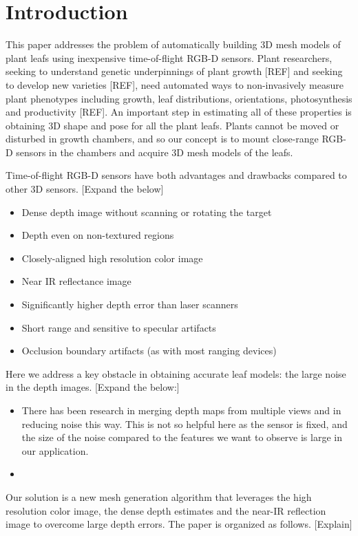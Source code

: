 \section{Introduction}
\label{sec:intro}

This paper addresses the problem of automatically building $3$D mesh models of plant leafs using inexpensive time-of-flight RGB-D sensors.  Plant researchers, seeking to understand genetic underpinnings of plant growth [REF] and seeking to develop new varieties [REF], need automated ways to non-invasively measure plant phenotypes including growth, leaf distributions, orientations, photosynthesis and productivity [REF].  An important step in estimating all of these properties is obtaining $3$D shape and pose for all the plant leafs.  Plants cannot be moved or disturbed in growth chambers, and so our concept is to mount close-range RGB-D sensors in the chambers and acquire 3D mesh models of the leafs.

Time-of-flight RGB-D sensors have both advantages and drawbacks compared to other 3D sensors.  [Expand the below]
\begin{itemize}
\item Dense depth image without scanning or rotating the target
\item Depth even on non-textured regions
\item Closely-aligned high resolution color image
\item Near IR reflectance image
\item Significantly higher depth error than laser scanners
\item Short range and sensitive to specular artifacts
\item Occlusion boundary artifacts (as with most ranging devices)
\end{itemize}

Here we address a key obstacle in obtaining accurate leaf models: the large noise in the depth images. [Expand the below:]
\begin{itemize}
\item There has been research in merging depth maps from multiple views and in reducing noise this way.  This is not so helpful here as the sensor is fixed, and the size of the noise compared to the features we want to observe is large in our application.
\item 
\end {itemize}

Our solution is a new mesh generation algorithm that leverages the high resolution color image, the dense depth estimates and the near-IR reflection image to overcome large depth errors.  The paper is organized as follows. [Explain]

